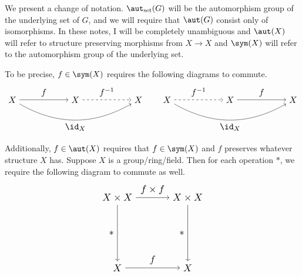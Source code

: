 \begin{note}
We present a change of notation. $\aut_{\textrm{set}}(G)$ will be the
automorphism group of the underlying set of $G$, and we will require
that $\aut(G)$ consist only of isomorphisms. In these notes, I will be
completely unambiguous and $\aut(X)$ will refer to structure preserving
morphisms from $X \to X$ and $\sym(X)$ will refer to the automorphism
group of the underlying set.

To be precise, $f \in \sym(X)$ requires the following diagrams to
commute.
\[ \begin{tikzpicture}[scale=3, nodes={scale=1.2}]
\node (X1)  at (0, 0) {$X$};
\node (X2)  at (1, 0) {$X$};
\node (X3)  at (2, 0) {$X$};

\path[->] (X1) edge             node[above]{$f$}        (X2)
          (X2) edge[dashed]     node[above]{$f^{-1}$}   (X3)
          (X1) edge[bend right] node[below]{$\id_X$}    (X3);
\end{tikzpicture} \qquad \begin{tikzpicture}[scale=3, nodes={scale=1.2}]
\node (X1)  at (0, 0) {$X$};
\node (X2)  at (1, 0) {$X$};
\node (X3)  at (2, 0) {$X$};

\path[->] (X2) edge             node[above]{$f$}        (X3)
          (X1) edge[dashed]     node[above]{$f^{-1}$}   (X2)
          (X1) edge[bend right] node[below]{$\id_X$}    (X3);
\end{tikzpicture} \]

Additionally, $f \in \aut(X)$ requires that $f \in \sym(X)$ and $f$
preserves whatever structure $X$ has. Suppose $X$ is a group/ring/field.
Then for each operation $*$, we require the following diagram to commute
as well.
\[ \begin{tikzpicture}[scale=3, nodes={scale=1.2}]
\node (XX1) at (0, 1) {$X \times X$};
\node (XX2) at (1, 1) {$X \times X$};
\node (X1)  at (0, 0) {$X$};
\node (X2)  at (1, 0) {$X$};

\path[->]
(XX1) edge node[above]{$f \times f$}    (XX2)
(XX1) edge node[left] {$*$}             (X1)
(X1)  edge node[above]{$f$}             (X2)
(XX2) edge node[left] {$*$}             (X2);
\end{tikzpicture} \]
\end{note}

